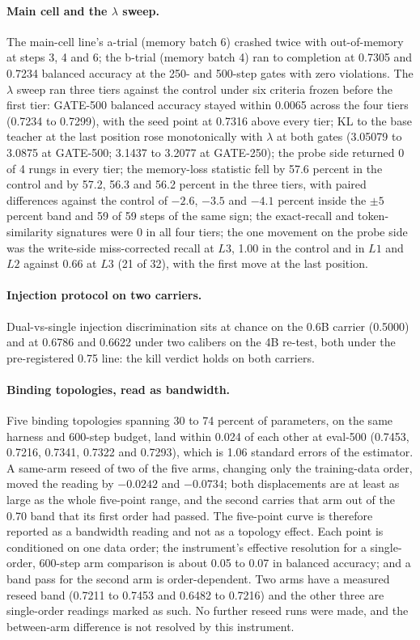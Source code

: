 \documentclass[11pt,a4paper]{article}
\begin{document}
\paragraph{Main cell and the $\lambda$ sweep.}
The main-cell line's a-trial (memory batch 6) crashed twice with out-of-memory at steps 3, 4 and 6; the b-trial (memory batch 4) ran to completion at 0.7305 and 0.7234 balanced accuracy at the 250- and 500-step gates with zero violations. The $\lambda$ sweep ran three tiers against the control under six criteria frozen before the first tier: GATE-500 balanced accuracy stayed within 0.0065 across the four tiers (0.7234 to 0.7299), with the seed point at 0.7316 above every tier; KL to the base teacher at the last position rose monotonically with $\lambda$ at both gates (3.05079 to 3.0875 at GATE-500; 3.1437 to 3.2077 at GATE-250); the probe side returned 0 of 4 rungs in every tier; the memory-loss statistic fell by 57.6 percent in the control and by 57.2, 56.3 and 56.2 percent in the three tiers, with paired differences against the control of $-2.6$, $-3.5$ and $-4.1$ percent inside the $\pm 5$ percent band and 59 of 59 steps of the same sign; the exact-recall and token-similarity signatures were 0 in all four tiers; the one movement on the probe side was the write-side miss-corrected recall at $L3$, 1.00 in the control and in $L1$ and $L2$ against 0.66 at $L3$ (21 of 32), with the first move at the last position.

\paragraph{Injection protocol on two carriers.}
Dual-vs-single injection discrimination sits at chance on the 0.6B carrier (0.5000) and at 0.6786 and 0.6622 under two calibers on the 4B re-test, both under the pre-registered 0.75 line: the kill verdict holds on both carriers.

\paragraph{Binding topologies, read as bandwidth.}
Five binding topologies spanning 30 to 74 percent of parameters, on the same harness and 600-step budget, land within 0.024 of each other at eval-500 (0.7453, 0.7216, 0.7341, 0.7322 and 0.7293), which is 1.06 standard errors of the estimator. A same-arm reseed of two of the five arms, changing only the training-data order, moved the reading by $-0.0242$ and $-0.0734$; both displacements are at least as large as the whole five-point range, and the second carries that arm out of the 0.70 band that its first order had passed. The five-point curve is therefore reported as a bandwidth reading and not as a topology effect. Each point is conditioned on one data order; the instrument's effective resolution for a single-order, 600-step arm comparison is about 0.05 to 0.07 in balanced accuracy; and a band pass for the second arm is order-dependent. Two arms have a measured reseed band (0.7211 to 0.7453 and 0.6482 to 0.7216) and the other three are single-order readings marked as such. No further reseed runs were made, and the between-arm difference is not resolved by this instrument.
\end{document}
